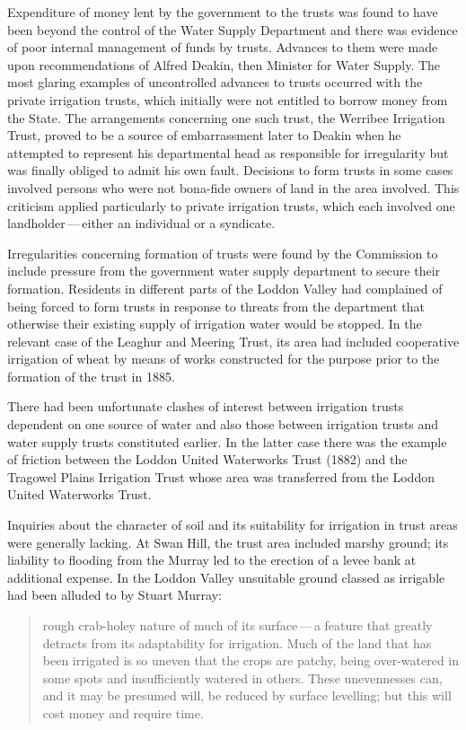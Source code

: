Expenditure of money lent by the government to the trusts was found to
have been beyond the control of the Water Supply Department and there
was evidence of poor internal management of funds by trusts.  Advances
to them were made upon recommendations of Alfred Deakin,
  then Minister
for Water Supply.  The most glaring examples of uncontrolled advances
to trusts occurred with the private irrigation trusts, which initially
were not entitled to borrow money from the State.  The arrangements
concerning one such trust, the Werribee Irrigation Trust,
 proved to be
a source of embarrassment later to Deakin when he attempted to
represent his departmental head as responsible for irregularity but
was finally obliged to admit his own fault.  Decisions to form trusts
in some cases involved persons who were not bona-fide owners of land
in the area involved.  This criticism applied particularly to private
irrigation trusts, which each involved one landholder\,---\,either an
individual or a syndicate.

Irregularities concerning formation of trusts were found by the
Commission to include pressure from the government water supply
department to secure their formation.  Residents in different parts of
the Loddon Valley  had complained of being forced
to form trusts in response to threats from the department that
otherwise their existing supply of irrigation water would be stopped.
In the relevant case of the Leaghur and Meering Trust,
 its area had
included cooperative irrigation of wheat by means of works constructed
for the purpose prior to the formation of the trust in 1885.

There had been unfortunate clashes of interest between irrigation
trusts dependent on one source of water and also those between
irrigation trusts and water supply trusts constituted earlier.  In the
latter case there was the example of friction between the Loddon
United Waterworks Trust  (1882)
and the Tragowel Plains Irrigation Trust
 whose area was transferred
from the Loddon United Waterworks Trust.


Inquiries about the character of soil and its suitability for
irrigation in trust areas were generally lacking.  At Swan Hill,
 the
trust area included marshy ground; its liability to flooding from the
Murray led to the erection of a levee bank at additional expense.  In
the Loddon Valley unsuitable ground classed as irrigable had been
alluded to by Stuart Murray: 
\begin{quote}
	rough crab-holey nature of much of its surface\,---\,a feature
	that greatly detracts from its adaptability for irrigation.
	Much of the land that has been irrigated is so uneven that the
	crops are patchy, being over-watered in some spots and
	insufficiently watered in others.  These unevennesses can, and
	it may be presumed will, be reduced by surface levelling; but
	this will cost money and require time.
\end{quote}

